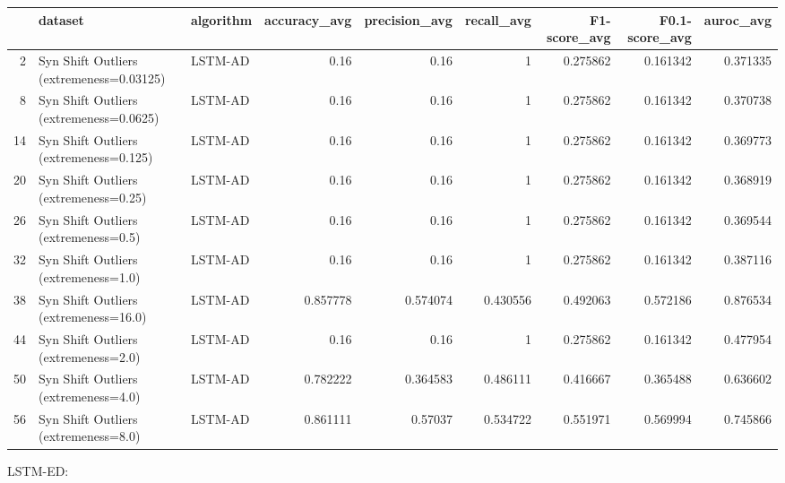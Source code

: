 \begin{tabular}{rllrrrrrr}
\hline
    & dataset                                  & algorithm   &   accuracy\_avg &   precision\_avg &   recall\_avg &   F1-score\_avg &   F0.1-score\_avg &   auroc\_avg \\
\hline
  2 & Syn Shift Outliers (extremeness=0.03125) & LSTM-AD     &       0.16     &        0.16     &     1        &       0.275862 &         0.161342 &    0.371335 \\
  8 & Syn Shift Outliers (extremeness=0.0625)  & LSTM-AD     &       0.16     &        0.16     &     1        &       0.275862 &         0.161342 &    0.370738 \\
 14 & Syn Shift Outliers (extremeness=0.125)   & LSTM-AD     &       0.16     &        0.16     &     1        &       0.275862 &         0.161342 &    0.369773 \\
 20 & Syn Shift Outliers (extremeness=0.25)    & LSTM-AD     &       0.16     &        0.16     &     1        &       0.275862 &         0.161342 &    0.368919 \\
 26 & Syn Shift Outliers (extremeness=0.5)     & LSTM-AD     &       0.16     &        0.16     &     1        &       0.275862 &         0.161342 &    0.369544 \\
 32 & Syn Shift Outliers (extremeness=1.0)     & LSTM-AD     &       0.16     &        0.16     &     1        &       0.275862 &         0.161342 &    0.387116 \\
 38 & Syn Shift Outliers (extremeness=16.0)    & LSTM-AD     &       0.857778 &        0.574074 &     0.430556 &       0.492063 &         0.572186 &    0.876534 \\
 44 & Syn Shift Outliers (extremeness=2.0)     & LSTM-AD     &       0.16     &        0.16     &     1        &       0.275862 &         0.161342 &    0.477954 \\
 50 & Syn Shift Outliers (extremeness=4.0)     & LSTM-AD     &       0.782222 &        0.364583 &     0.486111 &       0.416667 &         0.365488 &    0.636602 \\
 56 & Syn Shift Outliers (extremeness=8.0)     & LSTM-AD     &       0.861111 &        0.57037  &     0.534722 &       0.551971 &         0.569994 &    0.745866 \\
\hline
\end{tabular}

LSTM-ED:


